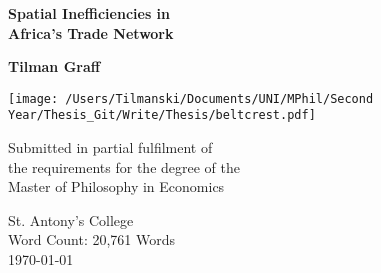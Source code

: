 \documentclass[11pt, oneside]{article}   	%
\begin{document}

\begin{titlepage}
    \begin{center}
        \vspace*{0cm}

        \Huge
        \textbf{Spatial Inefficiencies in \\
        Africa's Trade Network}

        \vspace{0.5cm}


        \vspace{1.5cm}
        \LARGE
        \textbf{Tilman Graff}

        \vfill

        \texttt{[image: /Users/Tilmanski/Documents/UNI/MPhil/Second Year/Thesis\_Git/Write/Thesis/beltcrest.pdf]}

        \vfill

        Submitted in partial fulfilment of \\
        the requirements for the degree of the \\
        Master of Philosophy in Economics

        \vspace{0.8cm}



        \large
        St. Antony's College\\
        Word Count: 20,761 Words\\
        \today

    \end{center}
\end{titlepage}

\newpage
\end{document}
